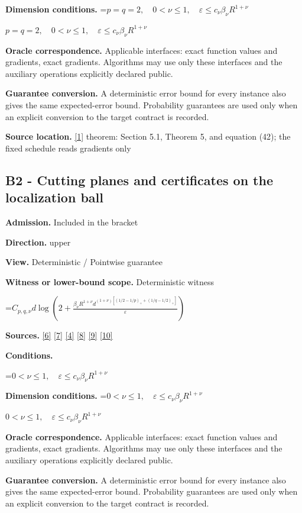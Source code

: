 \documentclass[10pt,a4paper]{article}
\newcommand{\AtlasMath}[1]{\par\begingroup\centering\setbox0=\hbox{$\displaystyle #1$}\ifdim\wd0>1.4\linewidth\typeout{ATLAS WIDE FORMULA: \the\wd0}\fi\ifdim\wd0>\linewidth\resizebox{\linewidth}{!}{\box0}\else\box0\fi\par\endgroup}
\newcommand{\AtlasInlineMath}[1]{\begingroup\setbox0=\hbox{$#1$}\ifdim\wd0>.4\linewidth\endgroup\AtlasMath{#1}\else\endgroup$#1$\fi}
\begin{document}
\textbf{Dimension conditions.} \AtlasInlineMath{p=q=2,\quad0<\nu\le1,\quad\varepsilon\le c_\nu\beta_\nu R^{1+\nu}}

\textbf{Oracle correspondence.} Applicable interfaces: exact function values and gradients, exact gradients. Algorithms may use only these interfaces and the auxiliary operations explicitly declared public.

\textbf{Guarantee conversion.} A deterministic error bound for every instance also gives the same expected-error bound. Probability guarantees are used only when an explicit conversion to the target contract is recorded.

\textbf{Source location.} \href{https://optimization-online.org/wp-content/uploads/2010/12/2865.pdf}{[1]} theorem: Section 5.1, Theorem 5, and equation (42); the fixed schedule reads gradients only

\subsection{B2 - Cutting planes and certificates on the localization ball}
\textbf{Admission.} Included in the bracket

\textbf{Direction.} upper

\textbf{View.} Deterministic / Pointwise guarantee

\textbf{Witness or lower-bound scope.} Deterministic witness

\AtlasMath{C_{p,q,\nu}d\log\left(2+\frac{\beta_\nu R^{1+\nu}d^{(1+\nu)[(1/2-1/p)_++(1/q-1/2)_+]}}{\varepsilon}\right)}
\textbf{Sources.} \href{https://arxiv.org/pdf/2101.09740v2}{[6]} \href{https://arxiv.org/pdf/2609.33360v2}{[7]} \href{https://arxiv.org/pdf/2609.10874}{[4]} \href{https://arxiv.org/pdf/1405.4980}{[8]} \href{https://www2.isye.gatech.edu/~nemirovs/MOR_AccuracyCertificates.pdf}{[9]} \href{https://arxiv.org/pdf/2609.20701}{[10]}

\textbf{Conditions.} 
\AtlasMath{0<\nu\le1,\quad\varepsilon\le c_\nu\beta_\nu R^{1+\nu}}


\textbf{Dimension conditions.} \AtlasInlineMath{0<\nu\le1,\quad\varepsilon\le c_\nu\beta_\nu R^{1+\nu}}

\textbf{Oracle correspondence.} Applicable interfaces: exact function values and gradients, exact gradients. Algorithms may use only these interfaces and the auxiliary operations explicitly declared public.

\textbf{Guarantee conversion.} A deterministic error bound for every instance also gives the same expected-error bound. Probability guarantees are used only when an explicit conversion to the target contract is recorded.
\end{document}
